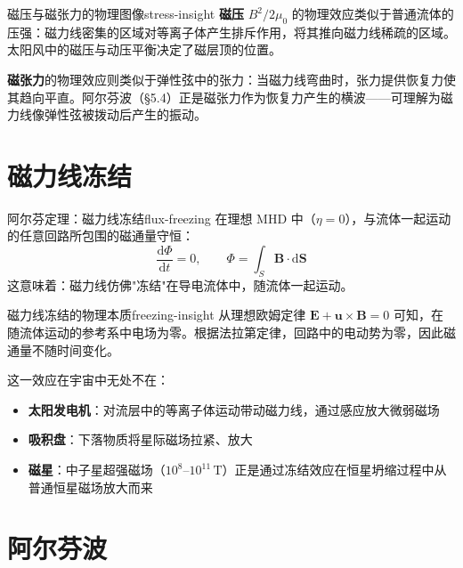\documentclass[12pt,a4paper,openany,oneside]{book}
\newcommand{\diff}{\mathrm{d}}
\newcommand{\vect}[1]{\bm{#1}}
\newcommand{\difficulty}[1]{\marginnote{\hfill\textcolor{coverMid!80}{\rule[-0.1em]{2pt}{0.9em}}\,\textcolor{coverMid}{\footnotesize\textbf{[#1]}}}}
\begin{document}
\begin{insight}{磁压与磁张力的物理图像}{stress-insight}
\textbf{磁压} $B^2/2\mu_0$ 的物理效应类似于普通流体的压强：磁力线密集的区域对等离子体产生排斥作用，将其推向磁力线稀疏的区域。太阳风中的磁压与动压平衡决定了磁层顶的位置。

\textbf{磁张力}的物理效应则类似于弹性弦中的张力：当磁力线弯曲时，张力提供恢复力使其趋向平直。阿尔芬波（\S5.4）正是磁张力作为恢复力产生的横波——可理解为磁力线像弹性弦被拨动后产生的振动。
\end{insight}

\section{磁力线冻结}\difficulty{基础}

\begin{theorem}{阿尔芬定理：磁力线冻结}{flux-freezing}
在理想 MHD 中（$\eta = 0$），与流体一起运动的任意回路所包围的磁通量守恒：
\[
\frac{\diff\Phi}{\diff t} = 0, \qquad \Phi = \int_S \vect{B}\cdot\diff\vect{S}
\]
这意味着：磁力线仿佛"冻结"在导电流体中，随流体一起运动。
\end{theorem}

\begin{insight}{磁力线冻结的物理本质}{freezing-insight}
从理想欧姆定律 $\vect{E} + \vect{u}\times\vect{B} = 0$ 可知，在随流体运动的参考系中电场为零。根据法拉第定律，回路中的电动势为零，因此磁通量不随时间变化。

这一效应在宇宙中无处不在：
\begin{itemize}
\item \textbf{太阳发电机}：对流层中的等离子体运动带动磁力线，通过感应放大微弱磁场
\item \textbf{吸积盘}：下落物质将星际磁场拉紧、放大
\item \textbf{磁星}：中子星超强磁场（$10^{8}$--$10^{11}\,\mathrm{T}$）正是通过冻结效应在恒星坍缩过程中从普通恒星磁场放大而来
\end{itemize}
\end{insight}

\section{阿尔芬波}\difficulty{基础}
\end{document}
